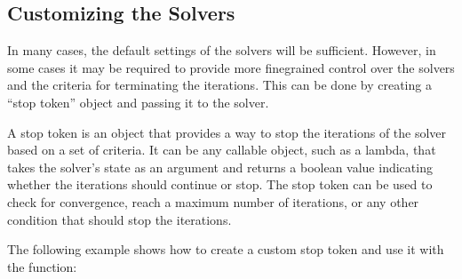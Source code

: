 \documentclass[letterpaper,10pt,english]{sphinxmanual}
\begin{document}
\subsection{Customizing the Solvers}
\label{\detokenize{docRoots:customizing-the-solvers}}
\sphinxAtStartPar
In many cases, the default settings of the solvers will be sufficient. However, in some cases it may be required to provide more fine\sphinxhyphen{}grained control over the solvers and the criteria for terminating the iterations. This can be done by creating a “stop token” object and passing it to the solver.

\sphinxAtStartPar
A stop token is an object that provides a way to stop the iterations of the solver based on a set of criteria. It can be any callable object, such as a lambda, that takes the solver’s state as an argument and returns a boolean value indicating whether the iterations should continue or stop. The stop token can be used to check for convergence, reach a maximum number of iterations, or any other condition that should stop the iterations.

\sphinxAtStartPar
The following example shows how to create a custom stop token and use it with the  function:

\begin{sphinxVerbatim}[commandchars=\\\{\}]
\PYG{p}{[}\PYG{p}{]}
\PYG{p}{[}\PYG{p}{]}
\end{sphinxVerbatim}
\end{document}
